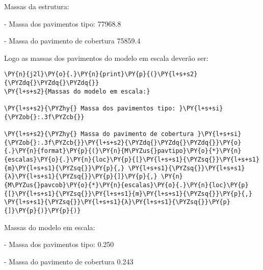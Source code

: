     Massas da estrutura:

- Massa dos pavimentos tipo: 77968.8

- Massa do pavimento de cobertura 75859.4

    
    Logo as massas dos pavimentos do modelo em escala deverão ser:

    \begin{tcolorbox}[breakable, size=fbox, boxrule=1pt, pad at break*=1mm,colback=cellbackground, colframe=cellborder]
\begin{Verbatim}[commandchars=\\\{\}]
\PY{n}{j2l}\PY{o}{.}\PY{n}{print}\PY{p}{(}\PY{l+s+s2}{\PYZdq{}\PYZdq{}\PYZdq{}}
\PY{l+s+s2}{Massas do modelo em escala:}

\PY{l+s+s2}{\PYZhy{} Massa dos pavimentos tipo: }\PY{l+s+si}{\PYZob{}:.3f\PYZcb{}}

\PY{l+s+s2}{\PYZhy{} Massa do pavimento de cobertura }\PY{l+s+si}{\PYZob{}:.3f\PYZcb{}}\PY{l+s+s2}{\PYZdq{}\PYZdq{}\PYZdq{}}\PY{o}{.}\PY{n}{format}\PY{p}{(}\PY{n}{M\PYZus{}pavtipo}\PY{o}{*}\PY{n}{escalas}\PY{o}{.}\PY{n}{loc}\PY{p}{[}\PY{l+s+s1}{\PYZsq{}}\PY{l+s+s1}{m}\PY{l+s+s1}{\PYZsq{}}\PY{p}{,} \PY{l+s+s1}{\PYZsq{}}\PY{l+s+s1}{λ}\PY{l+s+s1}{\PYZsq{}}\PY{p}{]}\PY{p}{,} \PY{n}{M\PYZus{}pavcob}\PY{o}{*}\PY{n}{escalas}\PY{o}{.}\PY{n}{loc}\PY{p}{[}\PY{l+s+s1}{\PYZsq{}}\PY{l+s+s1}{m}\PY{l+s+s1}{\PYZsq{}}\PY{p}{,} \PY{l+s+s1}{\PYZsq{}}\PY{l+s+s1}{λ}\PY{l+s+s1}{\PYZsq{}}\PY{p}{]}\PY{p}{)}\PY{p}{)}
\end{Verbatim}
\end{tcolorbox}

    
Massas do modelo em escala:

- Massa dos pavimentos tipo: 0.250

- Massa do pavimento de cobertura 0.243

    

